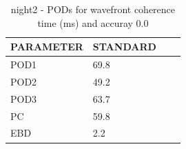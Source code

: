 \begin{table}[p!]
\begin{center}
\begin{tabular}{|l|l|l|l|}
\hline
\multicolumn{1}{|c|}{\cellcolor[HTML]{C0C0C0}\textbf{PARAMETER}} & \multicolumn{1}{c|}{\cellcolor[HTML]{C0C0C0}\textbf{STANDARD}} \\
\hline
\cellcolor[HTML]{C0C0C0}POD1  & 69.8                                \\
\cellcolor[HTML]{C0C0C0}POD2  & 49.2                                \\
\cellcolor[HTML]{C0C0C0}POD3  & 63.7                                \\
\cellcolor[HTML]{C0C0C0}PC    & 59.8                                  \\
\cellcolor[HTML]{C0C0C0}EBD   & 2.2                                 \\
\hline
\end{tabular}
\caption{night2 - PODs for wavefront coherence time (ms) and accuray 0.0}
\label{tab:podtau0.0:night2}
\end{center}
\end{table}
